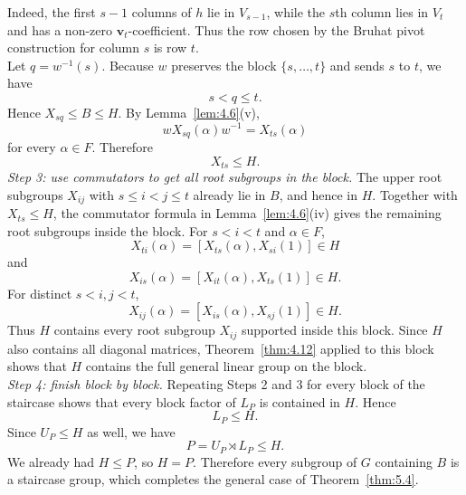 \documentclass[../Odyssey_Project.tex]{subfiles}
\begin{document}
\begin{solution}
\[\]
Indeed, the first $s-1$ columns of $h$ lie in $V_{s-1}$, while the $s$th column lies in $V_t$ and has a non-zero $\mathbf{v}_t$-coefficient. Thus the row chosen by the Bruhat pivot construction for column $s$ is row $t$.\\
Let $q=w^{-1}(s)$. Because $w$ preserves the block $\{s,\dots,t\}$ and sends $s$ to $t$, we have
\[
    s<q\leq t.
\]
Hence $X_{sq}\leq B\leq H$. By Lemma~\ref{lem:4.6}(v),
\[
    wX_{sq}(\alpha)w^{-1}=X_{ts}(\alpha)
\]
for every $\alpha\in F$. Therefore
\[
    X_{ts}\leq H.
\]
\textit{Step 3: use commutators to get all root subgroups in the block.} The upper root subgroups $X_{ij}$ with $s\leq i<j\leq t$ already lie in $B$, and hence in $H$. Together with $X_{ts}\leq H$, the commutator formula in Lemma~\ref{lem:4.6}(iv) gives the remaining root subgroups inside the block. For $s<i<t$ and $\alpha\in F$,
\[
    X_{ti}(\alpha)=[X_{ts}(\alpha),X_{si}(1)]\in H
\]
and
\[
    X_{is}(\alpha)=[X_{it}(\alpha),X_{ts}(1)]\in H.
\]
For distinct $s<i,j<t$,
\[
    X_{ij}(\alpha)=[X_{is}(\alpha),X_{sj}(1)]\in H.
\]
Thus $H$ contains every root subgroup $X_{ij}$ supported inside this block. Since $H$ also contains all diagonal matrices, Theorem~\ref{thm:4.12} applied to this block shows that $H$ contains the full general linear group on the block.\\
\textit{Step 4: finish block by block.} Repeating Steps 2 and 3 for every block of the staircase shows that every block factor of $L_P$ is contained in $H$. Hence
\[
    L_P\leq H.
\]
Since $U_P\leq H$ as well, we have
\[
    P=U_P\rtimes L_P\leq H.
\]
We already had $H\leq P$, so $H=P$. Therefore every subgroup of $G$ containing $B$ is a staircase group, which completes the general case of Theorem~\ref{thm:5.4}.
\end{solution}
\end{document}
